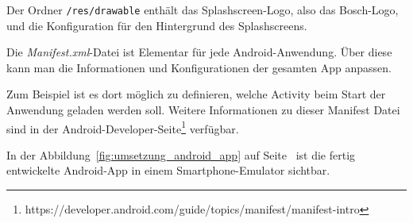Der Ordner \texttt{/res/drawable} enthält das Splashscreen-Logo, also das Bosch-Logo, und die Konfiguration für den
Hintergrund des Splashscreens.

Die \textit{Manifest.xml}-Datei ist Elementar für jede Android-Anwendung. Über diese kann man die Informationen und
Konfigurationen der gesamten App anpassen.

Zum Beispiel ist es dort möglich zu definieren, welche Activity beim Start der Anwendung geladen werden soll. Weitere
Informationen zu dieser Manifest Datei sind in der
Android-Developer-Seite\footnote{https://developer.android.com/guide/topics/manifest/manifest-intro} verfügbar.

In der Abbildung~\ref{fig:umsetzung_android_app} auf Seite~\pageref{fig:umsetzung_android_app} ist die fertig
entwickelte Android-App in einem Smartphone-Emulator sichtbar.

